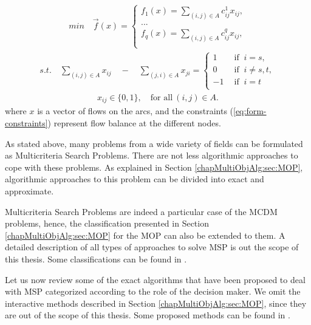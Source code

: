 \begin{eqnarray}
min \quad \vec f(x) =  \left\lbrace
  \begin{array}{l}
     f_1(x) = \displaystyle\sum_{(i,j) \in A}{c^1_{ij} x_{ij}}, \\
     ... \\
     f_q(x) = \displaystyle\sum_{(i,j) \in A}{c^q_{ij} x_{ij}}, \\
  \end{array}
  \right.
\end{eqnarray}
\begin{eqnarray}
\label{eq:form-constraints}
s.t. \quad \displaystyle\sum_{(i,j) \in A}{x_{ij}} \quad - \quad \displaystyle\sum_{(j,i) \in A}{x_{ji}} =  \left\lbrace
  \begin{array}{l}
     1 \qquad \text{if } \ i = s, \\
     0 \qquad \text{if } \ i\neq s,t, \\
     -1 \quad \ \text{if } \ i = t \\
  \end{array}
  \right.
\end{eqnarray}
\begin{eqnarray}
x_{ij} \in \{0,1\}, \quad \text{for all} \ (i,j) \in A.  
\end{eqnarray}
where $x$ is a vector of flows on the arcs, and the constraints (\ref{eq:form-constraints}) represent flow balance at the different nodes.

As stated above, many problems from a wide variety of fields can be formulated as Multicriteria Search Problems. There are not less algorithmic approaches to cope with these problems. As explained in Section \ref{chapMultiObjAlg:sec:MOP}, algorithmic approaches to this problem can be divided into exact and approximate. 

Multicriteria Search Problems are indeed a particular case of the MCDM problems, hence, the classification presented in Section \ref{chapMultiObjAlg:sec:MOP} for the MOP can also be extended to them. A detailed description of all types of approaches to solve MSP is out the scope of this thesis. Some classifications can be found in \citet{Ehrgott2000,ehrgott2005,Tarapata2007,climacopascoal2012}.  

Let us now review some of the exact algorithms that have been proposed to deal with MSP categorized according to the role of the decision maker. We omit the interactive methods described in Section \ref{chapMultiObjAlg:sec:MOP}, since they are out of the scope of this thesis. Some proposed methods can be found in \citet{Current1990,Granat2003}.

